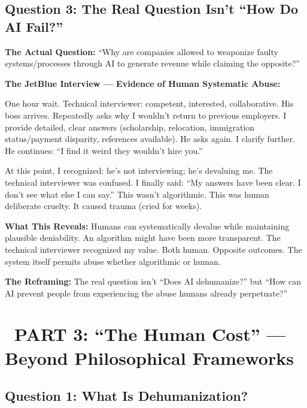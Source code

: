 \documentclass[12pt,letterpaper]{article}
\begin{document}
\subsection*{Question 3: The Real Question Isn't ``How Do AI Fail?''}

\begin{criticalinsight}
\textbf{The Actual Question:} ``Why are companies allowed to weaponize faulty systems/processes through AI to generate revenue while claiming the opposite?''
\end{criticalinsight}

\begin{personalreflection}
\textbf{The JetBlue Interview — Evidence of Human Systematic Abuse:}

One hour wait. Technical interviewer: competent, interested, collaborative. His boss arrives. Repeatedly asks why I wouldn't return to previous employers. I provide detailed, clear answers (scholarship, relocation, immigration status/payment disparity, references available). He asks again. I clarify further. He continues: ``I find it weird they wouldn't hire you.''

At this point, I recognized: he's not interviewing; he's devaluing me. The technical interviewer was confused. I finally said: ``My answers have been clear. I don't see what else I can say.'' This wasn't algorithmic. This was human deliberate cruelty. It caused trauma (cried for weeks).

\textbf{What This Reveals:} Humans can systematically devalue while maintaining plausible deniability. An algorithm might have been more transparent. The technical interviewer recognized my value. Both human. Opposite outcomes. The system itself permits abuse whether algorithmic or human.
\end{personalreflection}

\textbf{The Reframing:} The real question isn't ``Does AI dehumanize?'' but ``How can AI prevent people from experiencing the abuse humans already perpetuate?''

\newpage
\section*{\color{primaryblue}\faHeart\ PART 3: ``The Human Cost'' — Beyond Philosophical Frameworks}

\subsection*{Question 1: What Is Dehumanization?}
\end{document}
